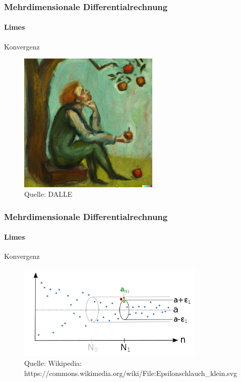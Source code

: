\documentclass{beamer}
\begin{document}
\begin{frame}
    \frametitle{Mehrdimensionale Differentialrechnung}
\framesubtitle{Limes}
    \begin{block}{Konvergenz}
\begin{figure}[H]
      \centering
    \includegraphics[width=0.6\textwidth]{images/newton}
      \caption{Quelle: DALLE}
\end{figure}

\end{block}

 \end{frame}


\begin{frame}
    \frametitle{Mehrdimensionale Differentialrechnung}
\framesubtitle{Limes}
    \begin{block}{Konvergenz}
\begin{figure}[H]
      \centering
    \includegraphics[width=0.8\textwidth]{images/500px-Epsilonschlauch_klein}
      \caption{Quelle: Wikipedia: https://commons.wikimedia.org/wiki/File:Epsilonschlauch\_klein.svg}
\end{figure}

\end{block}

 \end{frame}
\end{document}
